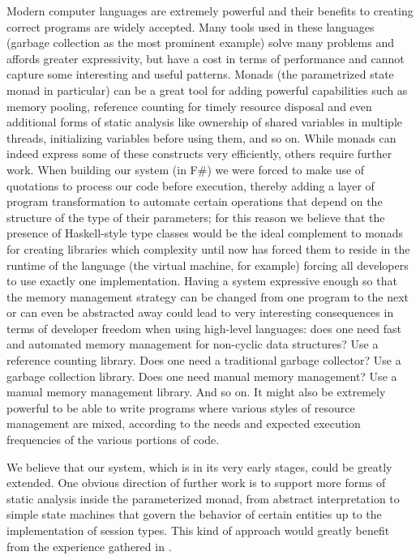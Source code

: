
Modern computer languages are extremely powerful and their benefits to creating correct programs are widely accepted. Many tools used in these languages (garbage collection as the most prominent example) solve many problems and affords greater expressivity, but have a cost in terms of performance and cannot capture some interesting and useful patterns. Monads (the parametrized state monad in particular) can be a great tool for adding powerful capabilities such as memory pooling, reference counting for timely resource disposal and even additional forms of static analysis like ownership of shared variables in multiple threads, initializing variables before using them, and so on. While monads can indeed express some of these constructs very efficiently, others require further work. When building our system (in F\#) we were forced to make use of quotations to process our code before execution, thereby adding a layer of program transformation to automate certain operations that depend on the structure of the type of their parameters; for this reason we believe that the presence of Haskell-style type classes would be the ideal complement to monads for creating libraries which complexity until now has forced them to reside in the runtime of the language (the virtual machine, for example) forcing all developers to use exactly one implementation. Having a system expressive enough so that the memory management strategy can be changed from one program to the next or can even be abstracted away could lead to very interesting consequences in terms of developer freedom when using high-level languages: does one need fast and automated memory management for non-cyclic data structures? Use a reference counting library. Does one need a traditional garbage collector? Use a garbage collection library. Does one need manual memory management? Use a manual memory management library. And so on. It might also be extremely powerful to be able to write programs where various styles of resource management are mixed, according to the needs and expected execution frequencies of the various portions of code.

We believe that our system, which is in its very early stages, could be greatly extended. One obvious direction of further work is to support more forms of static analysis inside the parameterized monad, from abstract interpretation to simple state machines that govern the behavior of certain entities up to the implementation of session types. This kind of approach would greatly benefit from the experience gathered in \cite{5_1,5_2,5_3,5_4}.

